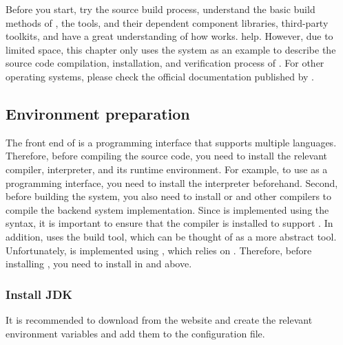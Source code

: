 \begin{content}
Before you start, try the \tf{} source build process, understand the basic build methods of \tf{}, the tools, and their dependent component libraries, third-party toolkits, and have a great understanding of how \tf{} works. help. However, due to limited space, this chapter only uses the  system as an example to describe the source code compilation, installation, and verification process of \tf{}. For other operating systems, please check the official documentation published by \tf{}.


\subsection{Environment preparation}
The front end of  is a programming interface that supports multiple languages. Therefore, before compiling the  source code, you need to install the relevant compiler, interpreter, and its runtime environment. For example, to use  as a programming interface, you need to install the  interpreter beforehand. Second, before building the system, you also need to install  or  and other  compilers to compile the backend system implementation. Since  is implemented using the  syntax, it is important to ensure that the  compiler is installed to support . In addition,  uses the  build tool, which can be thought of as a more abstract  tool. Unfortunately,  is implemented using , which relies on . Therefore, before installing , you need to install  in  and above.


\subsubsection{Install JDK}
It is recommended to download  from the  website and create the relevant environment variables and add them to the  configuration file.

\begin{leftbar}
\end{leftbar}



\end{content}
